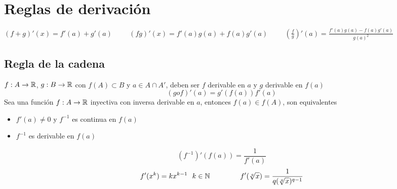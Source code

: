 \section{Reglas de derivación}
\begin{center}
$ (f+g)'(x) = f'(a)+g'(a) \hspace{1cm}
(fg)'(x) = f'(a)g(a) + f(a)g'(a) \hspace{1cm}
\left(\frac{f}{g}\right)'(a) = \frac{f'(a)g(a) - f(a)g'(a)}{g(a)^2}$
\end{center}
\subsection{Regla de la cadena}
$f:A\rightarrow\mathbb{R}$, $g:B\rightarrow\mathbb{R}$ con $f(A)\subset B$ y $a\in A\cap A'$, deben ser $f$ derivable en $a$ y $g$ derivable en $f(a)$
$$ (gof)'(a) = g'(f(a))f'(a) $$
Sea una función $f:A\rightarrow\mathbb{R}$ inyectiva con inversa derivable en $a$, entonces $f(a)\in f(A)$, son equivalentes
\begin{itemize}
	\item $f'(a)\not =0$ y $f^{-1}$ es continua en $f(a)$
	\item $f^{-1}$ es derivable en $f(a)$
\end{itemize}
$$ (f^{-1})'(f(a)) = \frac{1}{f'(a)} $$
$$ f'(x^k) = kx^{k-1} \ \ k\in\mathbb{N} \hspace{1.5cm}
 f'(\sqrt[q]{x}) = \frac{1}{ q(\sqrt[q]{x})^{q-1} }$$
